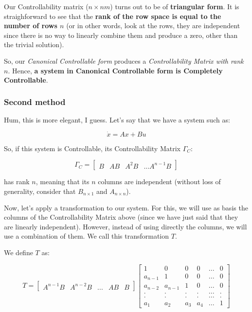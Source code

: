\documentclass[10pt,a4paper]{article}
\begin{document}
Our Controllability matrix ($n \times nm$) turns out to be of \textbf{triangular form}. It is straighforward to see that the \textbf{rank of the row space is equal to the number of rows $n$} (or in other words, look at the rows, they are independent since there is no way to linearly combine them and produce a zero, other than the trivial solution).

So, our \textit{Canonical Controllable form} produces a \textit{Controllability Matrix with rank $n$}. Hence, \textbf{a system in Canonical Controllable form is Completely Controllable}.

\subsubsection*{Second method}
Hum, this is more elegant, I guess. Let's say that we have a system such as:

\[ \dot{x} = Ax + Bu \]

So, if this system is Controllable, its Controllability Matrix $\Gamma_{C}$:

\[ \Gamma_{C} = 
\begin{bmatrix}
B & AB & A^{2}B & ... A^{n-1}B
\end{bmatrix}
\]

has rank $n$, meaning that its $n$ columns are independent (without loss of generality, consider that $B_{n \times 1}$ and $A_{n \times n}$).

Now, let's apply a transformation to our system. For this, we will use as basis the columns of the Controllability Matrix above (since we have just said that they are linearly independent). However, instead of using directly the columns, we will use a combination of them. We call this transformation $T$.
\medskip

We define $T$ as:

\begin{equation}
T = 
\begin{bmatrix}
A^{n-1}B & A^{n-2}B & ... & AB & B
\end{bmatrix}
\begin{bmatrix}
1 &  0 & 0 & 0  & ... & 0 \\
a_{n-1} & 1 & 0 & 0 & ... & 0 \\
a_{n-2} & a_{n-1} & 1 & 0 & ... & 0 \\
. & . & . & . &  ... & . \\
. & . & . & . &  ... & . \\
a_{1} & a_{2} & a_{3} & a_{4} & ... & 1 
\end{bmatrix}
\label{Eq:P4-T1}
\end{equation}
  
\end{document}
